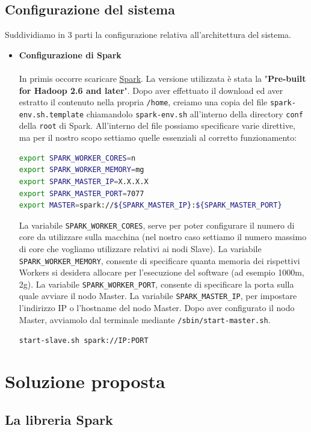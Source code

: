 \documentclass[11pt]{article}
\begin{document}
\subsection {Configurazione del sistema}
Suddividiamo in 3 parti la configurazione relativa all'architettura del sistema.
\begin{itemize}
\item {\textbf{Configurazione di Spark}}\\\\
In primis occorre scaricare \href{http://spark.apache.org/downloads.html}{Spark}. La versione utilizzata è stata la "\textbf{Pre-built for Hadoop 2.6 and later}".
Dopo aver effettuato il download ed aver estratto il contenuto nella propria \texttt{/home}, creiamo una copia del file \texttt{spark-env.sh.template} chiamandolo \texttt{spark-env.sh} all'interno della directory \texttt{conf} della \texttt{root} di Spark. All'interno del file possiamo specificare varie direttive, ma per il nostro scopo settiamo quelle essenziali al corretto funzionamento:
\begin{lstlisting}[language=bash, caption=spark-env.sh]
export SPARK_WORKER_CORES=n
export SPARK_WORKER_MEMORY=mg
export SPARK_MASTER_IP=X.X.X.X
export SPARK_MASTER_PORT=7077
export MASTER=spark://${SPARK_MASTER_IP}:${SPARK_MASTER_PORT}
\end{lstlisting}
La variabile \texttt{SPARK\_WORKER\_CORES}, serve per poter configurare il numero di core da utilizzare sulla macchina (nel nostro caso settiamo il numero massimo di core che vogliamo utilizzare relativi ai nodi Slave).
La variabile \texttt{SPARK\_WORKER\_MEMORY}, consente di specificare quanta memoria dei rispettivi Workers si desidera allocare per l'esecuzione del software (ad esempio 1000m, 2g).
La variabile \texttt{SPARK\_WORKER\_PORT}, consente di specificare la porta sulla quale avviare il nodo Master.
La variabile \texttt{SPARK\_MASTER\_IP}, per impostare l'indirizzo IP o l'hostname del nodo Master. Dopo aver configurato il nodo Master, avviamolo dal terminale mediante \texttt{/sbin/start-master.sh}.



\texttt{start-slave.sh spark://IP:PORT}
\end{itemize}

\section{Soluzione proposta}

\subsection{La libreria Spark}
\end{document}

